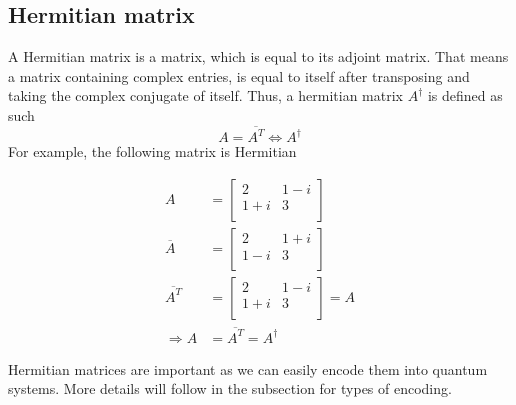 \subsection{Hermitian matrix}
A Hermitian matrix is a matrix, which is equal to its adjoint matrix. 
That means a matrix containing complex entries, is equal to itself after transposing and taking the complex conjugate of itself. 
Thus, a hermitian matrix $A^\dagger$ is defined as such
\begin{equation}
 A = \overline{A^T} \Leftrightarrow A^\dagger
\end{equation}
For example, the following matrix is Hermitian





\begin{equation}
\begin{split}
A &= \begin{bmatrix} 2 & 1-i \\ 1+i & 3 \\ \end{bmatrix} \\
\overline A &= \begin{bmatrix} 2 & 1+i \\ 1-i & 3 \\ \end{bmatrix}\\
\overline{A^T} &= \begin{bmatrix} 2 & 1-i \\ 1+i & 3 \\ \end{bmatrix} = A\\
\Rightarrow A &= \overline{A^T} = A^\dagger
\end{split}
\end{equation}

Hermitian matrices are important as we can easily encode them into quantum systems.
More details will follow in the subsection for types of encoding.


